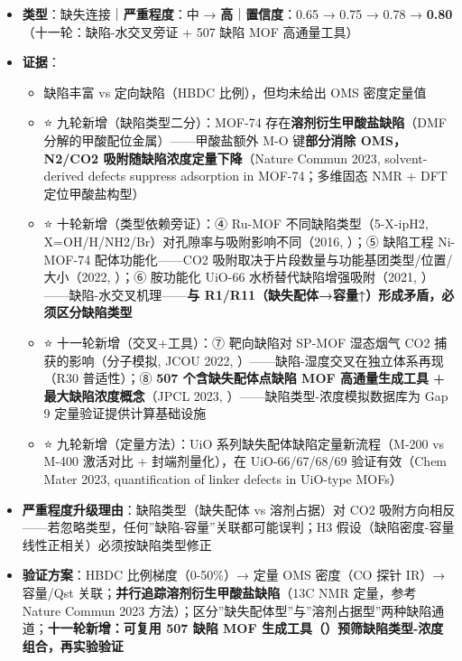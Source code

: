 \documentclass[12pt,a4paper]{ctexart}
\providecommand{\tightlist}{%
  \setlength{\itemsep}{0pt}\setlength{\parskip}{0pt}}
\begin{document}
\begin{itemize}
\tightlist
\item
  \textbf{类型}：缺失连接｜\textbf{严重程度}：中 → \textbf{高}｜\textbf{置信度}：0.65 → 0.75 → 0.78 → \textbf{0.80}（十一轮：缺陷-水交叉旁证 + 507 缺陷 MOF 高通量工具）
\item
  \textbf{证据}：

  \begin{itemize}
  \tightlist
  \item
    \cite{p192} 缺陷丰富 vs \cite{p13} 定向缺陷（HBDC 比例），但均未给出 OMS 密度定量值
  \item
    ⭐ 九轮新增（缺陷类型二分）：MOF-74 存在\textbf{溶剂衍生甲酸盐缺陷}（DMF 分解的甲酸配位金属）------甲酸盐额外 M-O 键\textbf{部分消除 OMS，N2/CO2 吸附随缺陷浓度定量下降}（Nature Commun 2023, solvent-derived defects suppress adsorption in MOF-74；多维固态 NMR + DFT 定位甲酸盐构型）
  \item
    ⭐ 十轮新增（类型依赖旁证）：④ Ru-MOF 不同缺陷类型（5-X-ipH2, X=OH/H/NH2/Br）对孔隙率与吸附影响不同（2016, \cite{r10s1_821919f491c8}）；⑤ 缺陷工程 Ni-MOF-74 配体功能化------CO2 吸附取决于片段数量与功能基团类型/位置/大小（2022, \cite{r10s2_0341d732c860}）；⑥ 胺功能化 UiO-66 水桥替代缺陷增强吸附（2021, \cite{r10s0_1fbbe940f717}）------缺陷-水交叉机理------\textbf{与 R1/R11（缺失配体→容量↑）形成矛盾，必须区分缺陷类型}
  \item
    ⭐ 十一轮新增（交叉+工具）：⑦ 靶向缺陷对 SP-MOF 湿态烟气 CO2 捕获的影响（分子模拟, JCOU 2022, \cite{r11s3_8dfa6887a211}）------缺陷-湿度交叉在独立体系再现（R30 普适性）；⑧ \textbf{507 个含缺失配体点缺陷 MOF 高通量生成工具 + 最大缺陷浓度概念}（JPCL 2023, \cite{r11s3_e8a9b380a8bb}）------缺陷类型-浓度模拟数据库为 Gap 9 定量验证提供计算基础设施
  \item
    ⭐ 九轮新增（定量方法）：UiO 系列缺失配体缺陷定量新流程（M-200 vs M-400 激活对比 + 封端剂量化），在 UiO-66/67/68/69 验证有效（Chem Mater 2023, quantification of linker defects in UiO-type MOFs）
  \end{itemize}
\item
  \textbf{严重程度升级理由}：缺陷类型（缺失配体 vs 溶剂占据）对 CO2 吸附方向相反------若忽略类型，任何''缺陷-容量''关联都可能误判；H3 假设（缺陷密度-容量线性正相关）必须按缺陷类型修正
\item
  \textbf{验证方案}：HBDC 比例梯度（0-50\%）→ 定量 OMS 密度（CO 探针 IR）→ 容量/Qst 关联；\textbf{并行追踪溶剂衍生甲酸盐缺陷}（13C NMR 定量，参考 Nature Commun 2023 方法）；区分''缺失配体型''与''溶剂占据型''两种缺陷通道；\textbf{十一轮新增：可复用 507 缺陷 MOF 生成工具（\cite{r11s3_e8a9b380a8bb}）预筛缺陷类型-浓度组合，再实验验证}
\end{itemize}
\end{document}
